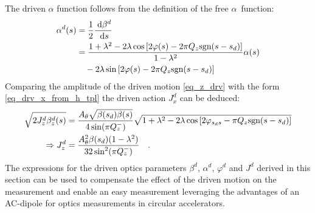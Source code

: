 %
The driven $\alpha$ function follows from the definition of the free $\alpha$~function:
\begin{align}
  \alpha^d(s) &=  \frac{1}{2}\frac{\;\text{d} \beta^d}{\;\text{d} s}\notag \\
  &= 
  \frac{1+\lambda^2-2\lambda\cos\left[ 2\varphi(s) - 2\pi Q_z\text{sgn}(s-s_d)\right]}{1-\lambda^2}
  \alpha(s) \notag \\
  &\quad- 2\lambda \sin\left[ 2\varphi(s) - 2\pi Q_z\text{sgn}(s-s_d) \right]
  \label{eq_drv_alpha}
\end{align}
%
Comparing the amplitude of the driven motion \eqref{eq_z_drv} with the form \eqref{eq_drv_x_from_h_tpl}
the driven action $J_x^d$ can be deduced:
%
\begin{align}
  \sqrt{2J_z^d\beta_z^d(s)} &= 
  \frac{A_\theta\sqrt{\beta(s_d)\beta(s)}}{4\sin(\pi Q_z^-)}
  \sqrt{1+\lambda^2-2\lambda\cos\left[2\varphi_{s_ds} - \pi Q_z\text{sgn}(s-s_d)\right]} \notag \\
  \Rightarrow J_z^d &=  \frac{A_\theta^2\beta(s_d)(1-\lambda^2)}{32 \sin^2(\pi Q_z^-)}
  \quad .
  \label{eq_drv_Jy}
\end{align}
%
The expressions for the driven optics parameters $\beta^d$, $\alpha^d$, $\varphi^d$ and $J^d$ derived
in this section can be used to compensate the effect of the driven motion on the measurement and enable
an easy measurement leveraging the advantages of an AC-dipole for optics measurements in circular
accelerators.
